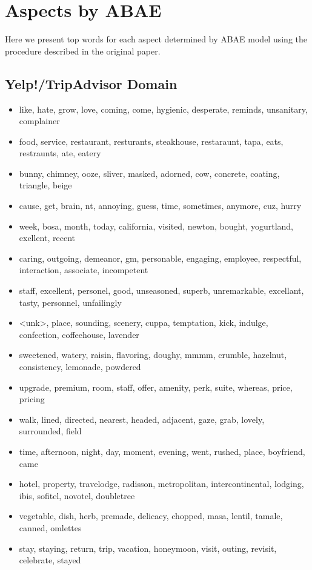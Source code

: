 \documentclass[11pt,a4paper]{article}
\begin{document}
\section{Aspects by ABAE}
\normalsize
Here we present top words for each aspect determined by ABAE model using the procedure described in the original paper.
\subsection{Yelp!/TripAdvisor Domain}
\begin{itemize}
\footnotesize
\item like, hate, grow, love, coming, come, hygienic, desperate, reminds, unsanitary, complainer 
\item food, service, restaurant, resturants, steakhouse, restaraunt, tapa, eats, restraunts, ate, eatery 
\item bunny, chimney, ooze, sliver, masked, adorned, cow, concrete, coating, triangle, beige 
\item  cause, get, brain, nt, annoying, guess, time, sometimes, anymore, cuz, hurry 
\item week, bosa, month, today, california, visited, newton, bought, yogurtland, exellent, recent
\item caring, outgoing, demeanor, gm, personable, engaging, employee, respectful, interaction, associate, incompetent 
\item staff, excellent, personel, good, unseasoned, superb, unremarkable, excellant, tasty, personnel, unfailingly 
\item <unk>, place, sounding, scenery, cuppa, temptation, kick, indulge, confection, coffeehouse, lavender 
\item sweetened, watery, raisin, flavoring, doughy, mmmm, crumble, hazelnut, consistency, lemonade, powdered 
\item upgrade, premium, room, staff, offer, amenity, perk, suite, whereas, price, pricing 
\item walk, lined, directed, nearest, headed, adjacent, gaze, grab, lovely, surrounded, field 
\item time, afternoon, night, day, moment, evening, went, rushed, place, boyfriend, came 
\item hotel, property, travelodge, radisson, metropolitan, intercontinental, lodging, ibis, sofitel, novotel, doubletree 
\item vegetable, dish, herb, premade, delicacy, chopped, masa, lentil, tamale, canned, omlettes 
\item stay, staying, return, trip, vacation, honeymoon, visit, outing, revisit, celebrate, stayed 

\end{itemize}
\end{document}
